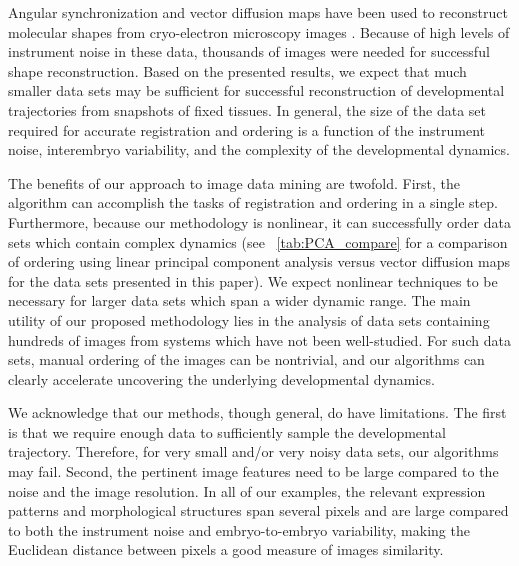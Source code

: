 Angular synchronization and vector diffusion maps have been used to reconstruct molecular shapes from cryo-electron microscopy images \citep{singer2012vector, zhao2014rotationally, singer2011viewing}.
%
Because of high levels of instrument noise in these data, thousands of images were needed for successful shape reconstruction.
%
Based on the presented results, we expect that much smaller data sets may be sufficient for successful reconstruction of developmental trajectories from snapshots of fixed tissues.
%
In general, the size of the data set required for accurate registration and ordering is a function of the instrument noise, interembryo variability, and the complexity of the developmental dynamics.

The benefits of our approach to image data mining are twofold.
%
First, the algorithm can accomplish the tasks of registration and ordering in a single step.
%
Furthermore, because our methodology is nonlinear, it can successfully order data sets which contain complex dynamics (see \tab~\ref{tab:PCA_compare} for a comparison of ordering using linear principal component analysis versus vector diffusion maps for the data sets presented in this paper).
%
We expect nonlinear techniques to be necessary for larger data sets which span a wider dynamic range.
%
The main utility of our proposed methodology lies in the analysis of data sets containing hundreds of images from systems which have not been well-studied.
%
For such data sets, manual ordering of the images can be nontrivial, and our algorithms can clearly accelerate uncovering the underlying developmental dynamics.

We acknowledge that our methods, though general, do have limitations.
%
The first is that we require enough data to sufficiently sample the developmental trajectory.
%
Therefore, for very small and/or very noisy data sets, our algorithms may fail.
%
Second, the pertinent image features need to be large compared to the noise and the image resolution.
%
In all of our examples, the relevant expression patterns and morphological structures span several pixels and are large compared to both the instrument noise and embryo-to-embryo variability, making the Euclidean distance between pixels a good measure of images similarity.

